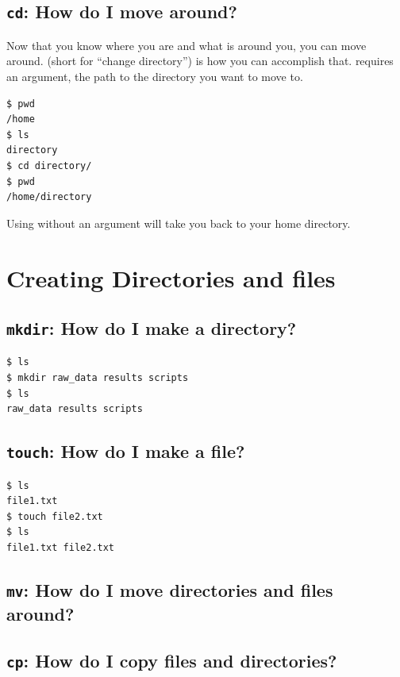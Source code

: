 \subsection{\texttt{cd}: How do I move around?}

Now that you know where you are and what is around you, you can move around.  (short for ``change directory'') is how you can accomplish that.  requires an argument, the path to the directory you want to move to.

\begin{lstlisting}
$ pwd
/home
$ ls
directory
$ cd directory/
$ pwd
/home/directory
\end{lstlisting}

Using  without an argument will take you back to your home directory.

\section{Creating Directories and files}

\subsection{\texttt{mkdir}: How do I make a directory?}

\begin{lstlisting}
$ ls
$ mkdir raw_data results scripts
$ ls
raw_data results scripts
\end{lstlisting}

\subsection{\texttt{touch}: How do I make a file?}

\begin{lstlisting}
$ ls
file1.txt
$ touch file2.txt
$ ls
file1.txt file2.txt
\end{lstlisting}

\subsection{\texttt{mv}: How do I move directories and files around?}


\subsection{\texttt{cp}: How do I copy files and directories?}


